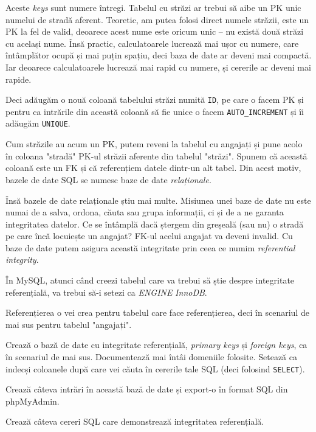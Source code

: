 Aceste \textit{keys} sunt numere întregi. Tabelul cu străzi ar trebui să aibe
un PK unic numelui de stradă aferent. Teoretic, am putea folosi direct
numele străzii, este un PK la fel de valid, deoarece acest nume este oricum unic --
nu există două străzi cu același nume. Însă practic, calculatoarele lucrează
mai ușor cu numere, care întâmplător ocupă și mai puțin spațiu, deci baza de date
ar deveni mai compactă. Iar deoarece calculatoarele lucrează mai rapid cu numere,
și cererile ar deveni mai rapide.

Deci adăugăm o nouă coloană tabelului străzi numită \texttt{ID}, pe care o facem
PK și pentru ca intrările din această coloană să fie unice o facem 
\texttt{AUTO\_INCREMENT} și îi adăugăm \texttt{UNIQUE}.

Cum străzile au acum un PK, putem reveni la tabelul cu angajați și pune acolo
în coloana "stradă" PK-ul străzii aferente din tabelul "străzi". Spunem că
această coloană este un FK și că referențiem datele dintr-un alt tabel.
Din acest motiv, bazele de date SQL se numesc baze de date \textsl{relaționale}.

Însă bazele de date relaționale știu mai multe. Misiunea unei baze de date
nu este numai de a salva, ordona, căuta sau grupa informații, ci și de a ne
garanta integritatea datelor. Ce se întâmplă dacă ștergem din greșeală (sau nu)
o stradă pe care încă locuiește un angajat? FK-ul acelui angajat va deveni
invalid. Cu baze de date putem asigura această integritate prin ceea ce numim
\textsl{referential integrity}.

În MySQL, atunci când creezi tabelul care va trebui să știe despre integritate
referențială, va trebui să-i setezi ca \textsl{ENGINE} \textsl{InnoDB}.

Referențierea o vei crea pentru tabelul care face referențierea, deci în scenariul
de mai sus pentru tabelul "angajați".

\begin{Exercise}[title={Referential Integrity},difficulty=1]
Crează o bază de date cu integritate referențială, \textit{primary keys} și
\textit{foreign keys}, ca în scenariul de mai sus. Documentează mai întâi domeniile
folosite. Setează ca indecși coloanele după care vei căuta în cererile tale
SQL (deci folosind \texttt{SELECT}).

Crează câteva intrări în această bază de date și export-o în format SQL din phpMyAdmin.

Crează câteva cereri SQL care demonstrează integritatea referențială.
\end{Exercise}


